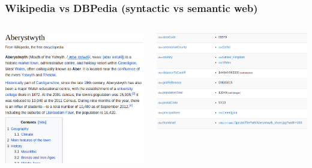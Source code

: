 \documentclass[aspectratio=169]{beamer} %
\begin{document}
\begin{frame}
\frametitle{Wikipedia vs DBPedia (syntactic vs semantic web)}
\begin{columns}


\includegraphics[width=\textwidth]{resources/aberwiki.png}


\includegraphics[width=\textwidth]{resources/aberpedia.png}

\end{columns}
\end{frame}
\end{document}
